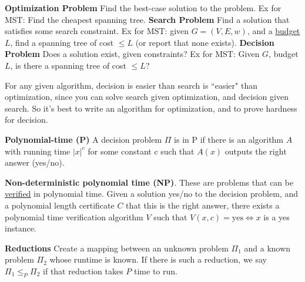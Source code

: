 \documentclass[10pt,landscape]{article}
\newcommand{\definition}[1]{\textbf{#1}\hspace{2pt}}
\begin{document}
\begin{multicols}{3}
\definition{Optimization Problem} Find the best-case solution to the problem. Ex for MST: Find the cheapest spanning tree.
\definition{Search Problem} Find a solution that satisfies some search constraint. Ex for MST: given $G = (V, E, w)$, and a \underline{budget} $L$, find a  spanning tree of cost $\leq L$ (or report that none exists).
\definition{Decision Problem} Does a solution exist, given constraints? Ex for MST: Given $G$, budget $L$, is there a spanning tree of cost $\leq L$?

For any given algorithm, decision is easier than search is ``easier" than optimization, since you can solve search given optimization, and decision given search. So it's best to write an algorithm for optimization, and to prove hardness for decision.

\definition{Polynomial-time (P)} A decision problem $\Pi$ is in P if there is an algorithm $A$ with running time $|x|^c$ for some constant c such that $A(x)$ outputs the right answer (yes/no).

\definition{Non-deterministic polynomial time (NP)}. These are problems that can be \underline{verified} in polynomial time. Given a solution yes/no to the decision problem, and a polynomial length certificate $C$ that this is the right answer, there exists a polynomial time verification algorithm $V$ such that $V(x,c) = \text{yes} \Leftrightarrow x $ is a yes instance.

\definition{Reductions} Create a mapping between an unknown problem $\Pi_1$ and a known problem $\Pi_2$ whose runtime is known. If there is such a reduction, we say $\Pi_1 \leq_P \Pi_2$ if that reduction takes $P$ time to run.


\end{multicols}
\end{document}
